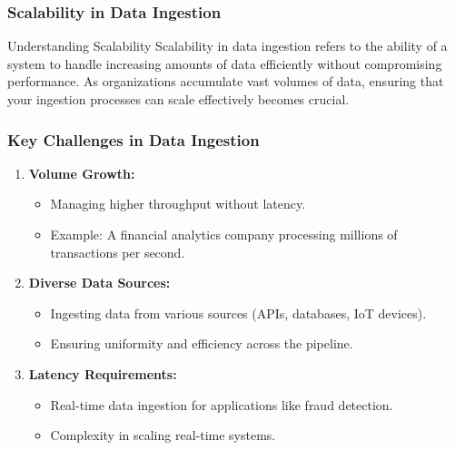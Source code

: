 \documentclass{beamer}
\begin{document}
\begin{frame}[fragile]
    \frametitle{Scalability in Data Ingestion}
    \begin{block}{Understanding Scalability}
        Scalability in data ingestion refers to the ability of a system to handle increasing amounts of data efficiently without compromising performance. 
        As organizations accumulate vast volumes of data, ensuring that your ingestion processes can scale effectively becomes crucial.
    \end{block}
\end{frame}

\begin{frame}[fragile]
    \frametitle{Key Challenges in Data Ingestion}
    \begin{enumerate}
        \item \textbf{Volume Growth:}
        \begin{itemize}
            \item Managing higher throughput without latency.
            \item Example: A financial analytics company processing millions of transactions per second.
        \end{itemize}
        \item \textbf{Diverse Data Sources:}
        \begin{itemize}
            \item Ingesting data from various sources (APIs, databases, IoT devices).
            \item Ensuring uniformity and efficiency across the pipeline.
        \end{itemize}
        \item \textbf{Latency Requirements:}
        \begin{itemize}
            \item Real-time data ingestion for applications like fraud detection.
            \item Complexity in scaling real-time systems.
        \end{itemize}
    \end{enumerate}
\end{frame}
\end{document}
